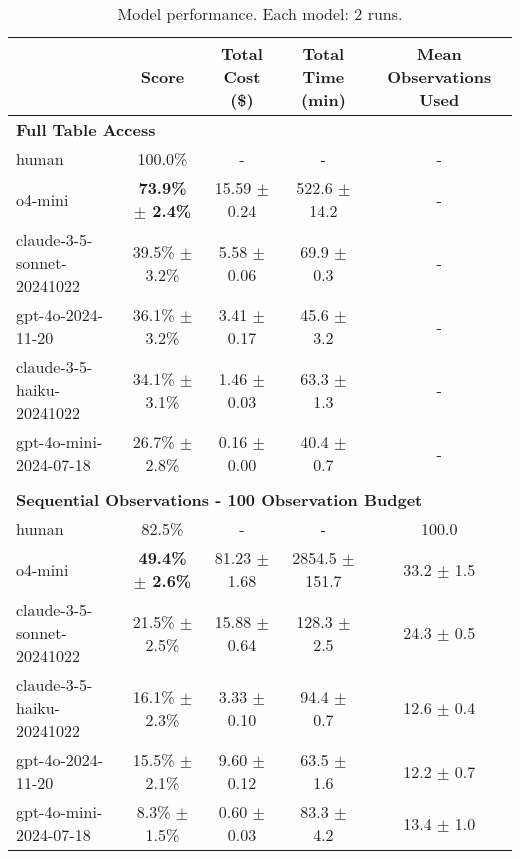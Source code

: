 
\begin{table*}[!htb]
    \centering
    \footnotesize
    \caption{Model performance. Each model: 2 runs.}\label{tab:performance}
    \begin{tabular}{lcccc}
    \toprule
    & \textbf{Score} & \textbf{Total Cost (\$)} & \textbf{Total Time (min)} & \textbf{Mean Observations Used} \\
    \midrule
    \multicolumn{5}{l}{\textbf{Full Table Access}} \\
    human & 100.0\% & - & - & - \\
    o4-mini & \textbf{73.9\% $\pm$ 2.4\%} & 15.59 $\pm$ 0.24 & 522.6 $\pm$ 14.2 & - \\
    claude-3-5-sonnet-20241022 & 39.5\% $\pm$ 3.2\% & 5.58 $\pm$ 0.06 & 69.9 $\pm$ 0.3 & - \\
    gpt-4o-2024-11-20 & 36.1\% $\pm$ 3.2\% & 3.41 $\pm$ 0.17 & 45.6 $\pm$ 3.2 & - \\
    claude-3-5-haiku-20241022 & 34.1\% $\pm$ 3.1\% & 1.46 $\pm$ 0.03 & 63.3 $\pm$ 1.3 & - \\
    gpt-4o-mini-2024-07-18 & 26.7\% $\pm$ 2.8\% & 0.16 $\pm$ 0.00 & 40.4 $\pm$ 0.7 & - \\
\\[0.5em]
    \multicolumn{5}{l}{\textbf{Sequential Observations - 100 Observation Budget}} \\
    human & 82.5\% & - & - & 100.0 \\
    o4-mini & \textbf{49.4\% $\pm$ 2.6\%} & 81.23 $\pm$ 1.68 & 2854.5 $\pm$ 151.7 & 33.2 $\pm$ 1.5 \\
    claude-3-5-sonnet-20241022 & 21.5\% $\pm$ 2.5\% & 15.88 $\pm$ 0.64 & 128.3 $\pm$ 2.5 & 24.3 $\pm$ 0.5 \\
    claude-3-5-haiku-20241022 & 16.1\% $\pm$ 2.3\% & 3.33 $\pm$ 0.10 & 94.4 $\pm$ 0.7 & 12.6 $\pm$ 0.4 \\
    gpt-4o-2024-11-20 & 15.5\% $\pm$ 2.1\% & 9.60 $\pm$ 0.12 & 63.5 $\pm$ 1.6 & 12.2 $\pm$ 0.7 \\
    gpt-4o-mini-2024-07-18 & 8.3\% $\pm$ 1.5\% & 0.60 $\pm$ 0.03 & 83.3 $\pm$ 4.2 & 13.4 $\pm$ 1.0 \\
    \bottomrule
    \end{tabular}
\end{table*}
